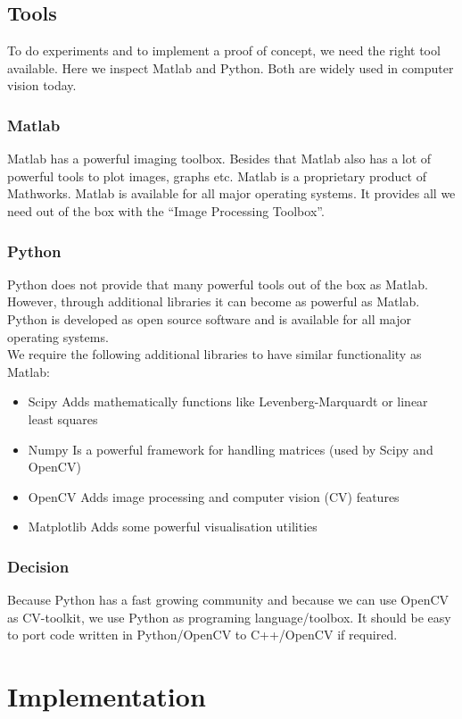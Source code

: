 \documentclass[11pt,a4paper,titlepage,oneside]{report}
\begin{document}
\section{Tools}
To do experiments and to implement a proof of concept, we need the right tool available. Here we inspect Matlab and Python. Both are widely used in computer vision today.

\subsection{Matlab}
Matlab has a powerful imaging toolbox. Besides that Matlab also has a lot of powerful tools to plot images, graphs etc. Matlab is a proprietary product of Mathworks. Matlab is available for all major operating systems. It provides all we need out of the box with the ``Image Processing Toolbox''.

\subsection{Python}
Python does not provide that many powerful tools out of the box as Matlab. However, through additional libraries it can become as powerful as Matlab. Python is developed as open source software and is available for all major operating systems.\\
We require the following additional libraries to have similar functionality as Matlab:
\begin{itemize}
  \item Scipy
    \subitem Adds mathematically functions like Levenberg-Marquardt or linear least squares
  \item Numpy
		\subitem Is a powerful framework for handling matrices (used by Scipy and OpenCV)
  \item OpenCV
		\subitem Adds image processing and computer vision (CV) features
  \item Matplotlib
    \subitem Adds some powerful visualisation utilities
\end{itemize}

\subsection{Decision}
Because Python has a fast growing community and because we can use OpenCV as CV-toolkit, we use Python as programing language/toolbox. It should be easy to port code written in Python/OpenCV to C++/OpenCV if required.

\chapter{Implementation}\label{chap:implementation}
\end{document}
